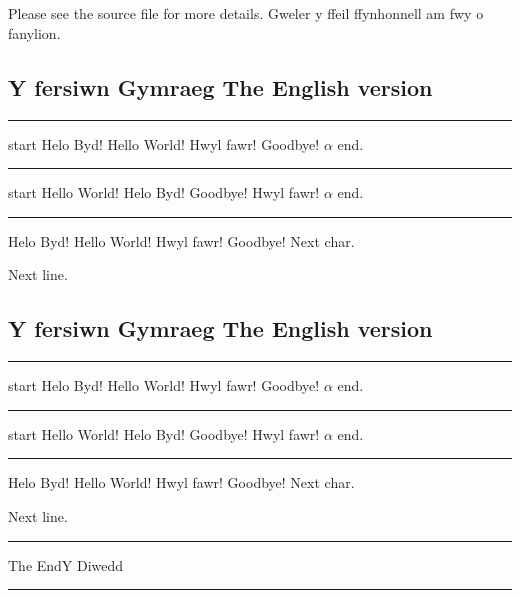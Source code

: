 \documentclass{article}
\begin{document}
\section{}

\en Please see the source file for more details.
\cy Gweler y ffeil ffynhonnell am fwy o fanylion.

\welshon %
\subsection*{\cy Y fersiwn Gymraeg \en The English version}

\bigskip\hrule\bigskip

start \cy Helo Byd! \en Hello World! \cy Hwyl fawr! \en Goodbye! $\alpha$ end.

\bigskip\hrule\bigskip

start \en Hello World! \cy Helo Byd! \en Goodbye! \cy Hwyl fawr! $\alpha$ end.

\bigskip\hrule\bigskip

\cy Helo Byd! \en Hello World! \cy Hwyl fawr! \en Goodbye!
Next char.

Next line.

\welshoff %
\subsection*{\cy Y fersiwn Gymraeg \en The English version}

\bigskip\hrule\bigskip

start \cy Helo Byd! \en Hello World! \cy Hwyl fawr! \en Goodbye! $\alpha$ end.

\bigskip\hrule\bigskip

start \en Hello World! \cy Helo Byd! \en Goodbye! \cy Hwyl fawr! $\alpha$ end.

\bigskip\hrule\bigskip

\strut\cy Helo Byd! \en Hello World! \cy Hwyl fawr! \en Goodbye!
Next char.

Next line.

\resetlanguage

\bigskip
\hrule
\bigskip
\begin{center}\Large\scshape
\strut\en The End\cy Y Diwedd \bi
\normalsize\normalfont\end{center}
\bigskip
\hrule
\end{document}
